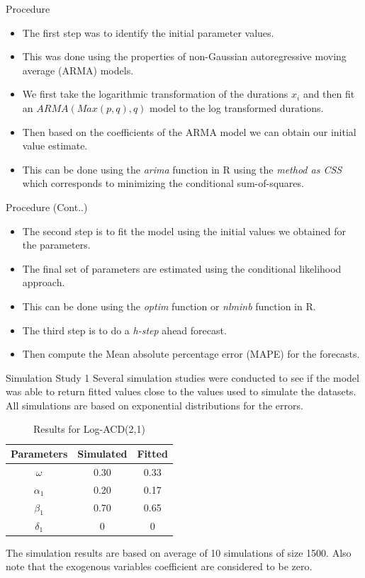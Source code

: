 \documentclass[
  ignorenonframetext,
]{beamer}
\begin{document}
\begin{frame}{Procedure}
\protect\hypertarget{procedure}{}
\begin{itemize}
\item
  The first step was to identify the initial parameter values.
\item
  This was done using the properties of non-Gaussian autoregressive
  moving average (ARMA) models.
\item
  We first take the logarithmic transformation of the durations \(x_i\)
  and then fit an \(ARMA(Max(p,q),q)\) model to the log transformed
  durations.
\item
  Then based on the coefficients of the ARMA model we can obtain our
  initial value estimate.
\item
  This can be done using the \emph{arima} function in R using the
  \emph{method as CSS} which corresponds to minimizing the conditional
  sum-of-squares.
\end{itemize}
\end{frame}

\begin{frame}{Procedure (Cont..)}
\protect\hypertarget{procedure-cont..}{}
\begin{itemize}
\item
  The second step is to fit the model using the initial values we
  obtained for the parameters.
\item
  The final set of parameters are estimated using the conditional
  likelihood approach.
\item
  This can be done using the \emph{optim} function or \emph{nlminb}
  function in R.
\item
  The third step is to do a \emph{h-step} ahead forecast.
\item
  Then compute the Mean absolute percentage error (MAPE) for the
  forecasts.
\end{itemize}
\end{frame}

\begin{frame}{Simulation Study 1}
\protect\hypertarget{simulation-study-1}{}
Several simulation studies were conducted to see if the model was able
to return fitted values close to the values used to simulate the
datasets. All simulations are based on exponential distributions for the
errors.

\begin{table}[ht]
\caption{Results for Log-ACD(2,1)}
\begin{tabular}{|c|c|c|}
 \hline
 Parameters& Simulated & Fitted \\
 \hline
 $\omega$   & 0.30 & 0.33 \\
 $\alpha_1$   & 0.20 & 0.17 \\
 $\beta_1$   & 0.70 & 0.65 \\
 $\delta_1$  & 0  & 0 \\
 \hline
\end{tabular}
\end{table}

The simulation results are based on average of 10 simulations of size
1500. Also note that the exogenous variables coefficient are considered
to be zero.
\end{frame}
\end{document}
